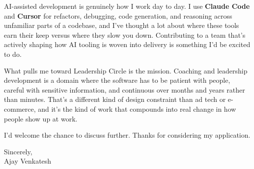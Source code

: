 \documentclass[letterpaper,11pt]{article}
\begin{document}
AI-assisted development is genuinely how I work day to day. I use \textbf{Claude Code} and \textbf{Cursor} for refactors, debugging, code generation, and reasoning across unfamiliar parts of a codebase, and I've thought a lot about where these tools earn their keep versus where they slow you down. Contributing to a team that's actively shaping how AI tooling is woven into delivery is something I'd be excited to do.

What pulls me toward Leadership Circle is the mission. Coaching and leadership development is a domain where the software has to be patient with people, careful with sensitive information, and continuous over months and years rather than minutes. That's a different kind of design constraint than ad tech or e-commerce, and it's the kind of work that compounds into real change in how people show up at work.

I'd welcome the chance to discuss further. Thanks for considering my application.

\vspace{12pt}
Sincerely, \\
Ajay Venkatesh
\end{document}
